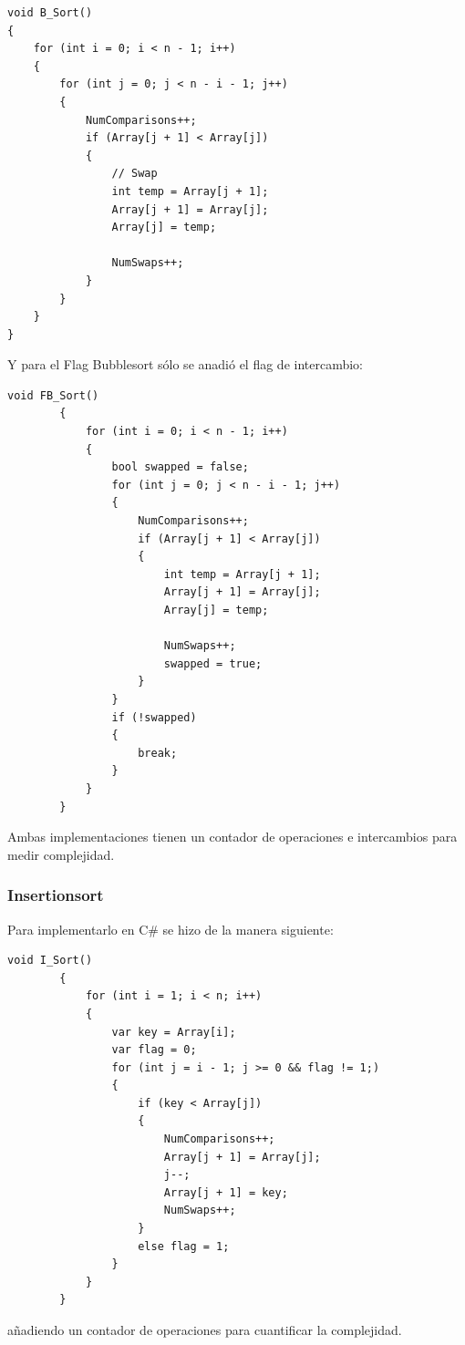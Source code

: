 \documentclass[conference]{IEEEtran}
\begin{document}
\begin{verbatim}
void B_Sort()
{
    for (int i = 0; i < n - 1; i++)
    {
        for (int j = 0; j < n - i - 1; j++)
        {
            NumComparisons++;
            if (Array[j + 1] < Array[j])
            {
                // Swap
                int temp = Array[j + 1];
                Array[j + 1] = Array[j];
                Array[j] = temp;

                NumSwaps++;
            }
        }
    }
}
\end{verbatim}
Y para el Flag Bubblesort sólo se anadió el flag de intercambio:
\begin{verbatim}
void FB_Sort()
        {
            for (int i = 0; i < n - 1; i++)
            {
                bool swapped = false;
                for (int j = 0; j < n - i - 1; j++)
                {
                    NumComparisons++;
                    if (Array[j + 1] < Array[j])
                    {
                        int temp = Array[j + 1];
                        Array[j + 1] = Array[j];
                        Array[j] = temp;

                        NumSwaps++;
                        swapped = true;
                    }
                }
                if (!swapped)
                {
                    break;
                }
            }
        }
\end{verbatim}
Ambas implementaciones tienen un contador de operaciones e intercambios para medir complejidad.

\subsubsection{Insertionsort}
Para implementarlo en C\# se hizo de la manera siguiente:
\begin{verbatim}
void I_Sort()
        {
            for (int i = 1; i < n; i++)
            {
                var key = Array[i];
                var flag = 0;
                for (int j = i - 1; j >= 0 && flag != 1;)
                {
                    if (key < Array[j])
                    {
                        NumComparisons++;
                        Array[j + 1] = Array[j];
                        j--;
                        Array[j + 1] = key;
                        NumSwaps++;
                    }
                    else flag = 1;
                }
            }
        }
\end{verbatim}
añadiendo un contador de operaciones para cuantificar la complejidad.
\end{document}
